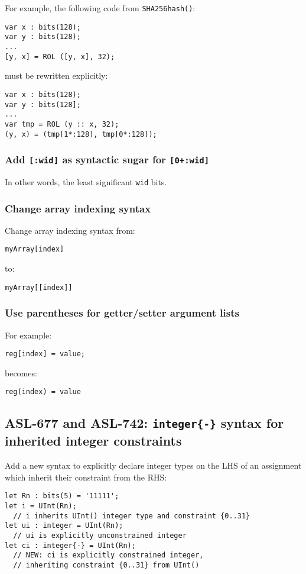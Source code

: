 For example, the following code from \texttt{SHA256hash()}:
\begin{verbatim}
var x : bits(128);
var y : bits(128);
...
[y, x] = ROL ([y, x], 32);
\end{verbatim}
must be rewritten explicitly:
\begin{verbatim}
var x : bits(128);
var y : bits(128];
...
var tmp = ROL (y :: x, 32);
(y, x) = (tmp[1*:128], tmp[0*:128]);
\end{verbatim}

\subsubsection{Add \texttt{[:wid]} as syntactic sugar for \texttt{[0+:wid]}}

In other words, the least significant \texttt{wid} bits.

\subsubsection{Change array indexing syntax}

Change array indexing syntax from:
\begin{verbatim}
myArray[index]
\end{verbatim}
to:
\begin{verbatim}
myArray[[index]]
\end{verbatim}

\subsubsection{Use parentheses for getter/setter argument lists}

For example:
\begin{verbatim}
reg[index] = value;
\end{verbatim}
becomes:
\begin{verbatim}
reg(index) = value
\end{verbatim}

\subsection{ASL-677 and ASL-742: \texttt{integer\{-\}} syntax for inherited integer constraints}
Add a new syntax to explicitly declare integer types on the LHS of an assignment
which inherit their constraint from the RHS:

\begin{verbatim}
let Rn : bits(5) = '11111';
let i = UInt(Rn);
  // i inherits UInt() integer type and constraint {0..31}
let ui : integer = UInt(Rn);
  // ui is explicitly unconstrained integer
let ci : integer{-} = UInt(Rn);
  // NEW: ci is explicitly constrained integer,
  // inheriting constraint {0..31} from UInt()
\end{verbatim}

